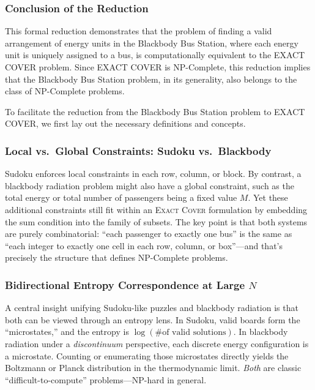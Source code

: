 \documentclass{report}
\begin{document}
\subsubsection*{Conclusion of the Reduction}

This formal reduction demonstrates that the problem of finding a valid arrangement of energy units in the Blackbody Bus Station, where each energy unit is uniquely assigned to a bus, is computationally equivalent to the EXACT COVER problem. Since EXACT COVER is NP-Complete, this reduction implies that the Blackbody Bus Station problem, in its generality, also belongs to the class of NP-Complete problems.

To facilitate the reduction from the Blackbody Bus Station problem to EXACT COVER, we first lay out the necessary definitions and concepts.


\subsubsection*{Local vs.\ Global Constraints: Sudoku vs.\ Blackbody}
Sudoku enforces local constraints in each row, column, or block. By contrast, a blackbody radiation 
problem might also have a global constraint, such as the total energy or total number of passengers 
being a fixed value \(M\). Yet these additional constraints still fit within an \textsc{Exact 
Cover} formulation by embedding the sum condition into the family of subsets. The key point is that 
both systems are purely combinatorial: ``each passenger to exactly one bus'' is the same as 
``each integer to exactly one cell in each row, column, or box''—and that’s precisely the structure 
that defines NP-Complete problems.

\subsubsection*{Bidirectional Entropy Correspondence at Large \texorpdfstring{$N$}{N}}
A central insight unifying Sudoku-like puzzles and blackbody radiation is that both can be viewed
through an entropy lens. In Sudoku, valid boards form the ``microstates,'' and the entropy is
\(\log(\text{\# of valid solutions})\). In blackbody radiation under a \emph{discontinuum}
perspective, each discrete energy configuration is a microstate. Counting or enumerating those
microstates directly yields the Boltzmann or Planck distribution in the thermodynamic limit.
\emph{Both} are classic ``difficult-to-compute'' problems—\(\mathrm{NP}\)-hard in general. 
\end{document}
